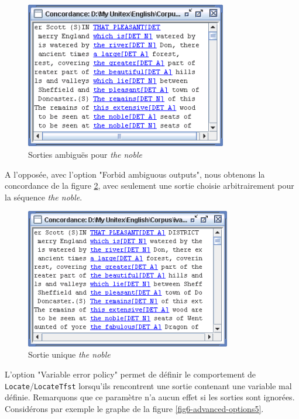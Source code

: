 \bigskip
\begin{figure}[!h]
\begin{center}
\includegraphics[width=8.8cm]{resources/img/fig6-advanced-options3.png}
\caption{Sorties ambiguës pour \textit{the noble}\label{fig6-advanced-options3}}
\end{center}
\end{figure}


\noindent A l'opposée, avec l'option "Forbid ambiguous
outputs", nous obtenons la concordance de la figure \ref{fig6-advanced-options4},
avec seulement une sortie choisie arbitrairement pour la séquence \textit{the noble}.

\bigskip
\begin{figure}[!h]
\begin{center}
\includegraphics[width=9cm]{resources/img/fig6-advanced-options4.png}
\caption{Sortie unique \textit{the noble}\label{fig6-advanced-options4}}
\end{center}
\end{figure}


\bigskip
\noindent L'option "Variable error policy" permet de définir le comportement de
\verb+Locate+/\verb+LocateTfst+ lorsqu'ils rencontrent une sortie contenant une variable mal
définie. Remarquons que ce paramètre n'a aucun effet si les sorties sont ignorées. 
Considérons par exemple le graphe de la figure
\ref{fig6-advanced-options5}. 

